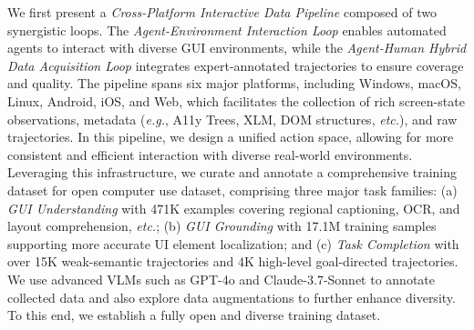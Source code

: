 \documentclass{article} %
\def\eg{\emph{e.g.}}
\def\etc{\emph{etc.}}
\begin{document}
We first present a \textit{Cross-Platform Interactive Data Pipeline} composed of two synergistic loops. The \textit{Agent-Environment Interaction Loop} enables automated agents to interact with diverse GUI environments, while the \textit{Agent-Human Hybrid Data Acquisition Loop} integrates expert-annotated trajectories to ensure coverage and quality. The pipeline spans six major platforms, including Windows, macOS, Linux, Android, iOS, and Web, which facilitates the collection of rich screen-state observations, metadata (\eg, A11y Trees, XLM, DOM structures, \etc), and raw trajectories. In this pipeline, we design a unified action space, allowing for more consistent and efficient interaction with diverse real-world environments. 
Leveraging this infrastructure, we curate and annotate a comprehensive training dataset for open computer use dataset, comprising three major task families: (a) \textit{GUI Understanding} with 471K examples covering regional captioning, OCR, and layout comprehension, \etc; (b) \textit{GUI Grounding} with 17.1M training samples supporting more accurate UI element localization; and (c) \textit{Task Completion} with over 15K weak-semantic trajectories and 4K high-level goal-directed trajectories. 
We use advanced VLMs such as GPT-4o and Claude-3.7-Sonnet to annotate collected data and also explore data augmentations to further enhance diversity. 
To this end, we establish a fully open and diverse training dataset.
\end{document}
